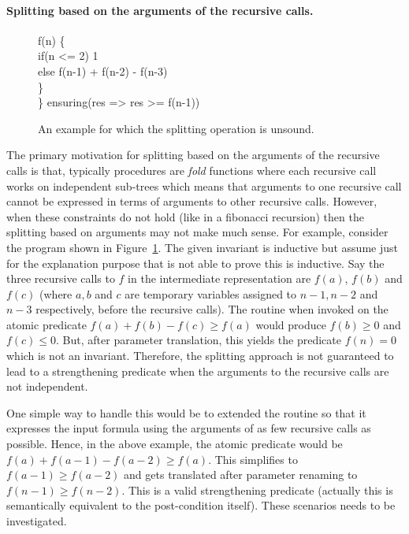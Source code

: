 \paragraph{Splitting based on the arguments of the recursive calls.}

\begin{figure}
\begin{myprogram}
f(n) \{ \\
\pnl \> if(n <= 2) 1 \\
\pnl \> else f(n-1) + f(n-2) - f(n-3) \\
\> \} \\
\} ensuring(res => res >= f(n-1))
\end{myprogram}
\caption{An example for which the splitting operation is unsound.} \label{fig:eg4}
\end{figure}
%
The primary motivation for splitting based on the arguments of the recursive calls
is that, typically procedures are \emph{fold} functions where each recursive call 
works on independent sub-trees which means that arguments to one recursive call
cannot be expressed in terms of  arguments to other recursive calls. 
However, when these constraints do not hold (like in a fibonacci 
recursion) then the splitting based on arguments may not make much sense.
For example, consider the program shown in Figure~\ref{fig:eg4}.
The given invariant is inductive  but  assume just for the explanation purpose that 
\SDecide is not able to prove this is inductive.
Say the three recursive calls to 
$f$ in the intermediate representation are $f(a)$, $f(b)$ and $f(c)$ (where $a,b$ and $c$
are temporary variables assigned to $n-1,n-2$ and $n-3$ respectively, before the
recursive calls). 
The \SG routine when invoked on the atomic predicate $f(a) + f(b) - f(c) \ge f(a)$
would produce $f(b) \ge 0$ and $f(c) \le 0$. But, after parameter translation, this yields 
the predicate $f(n) = 0$ which is not an invariant.
Therefore, the splitting approach is not guaranteed to lead to a strengthening predicate
when the arguments to the recursive calls are not independent.

One simple way to handle this would be to extended the \Eliminate routine so that it
expresses the input formula using the arguments of as few recursive calls as possible.
Hence, in the above example, the atomic predicate would be $f(a) + f(a-1) - f(a-2) \ge f(a)$.
This simplifies to $f(a-1) \ge f(a-2)$ and gets translated after parameter renaming to 
$f(n-1) \ge f(n-2)$. This is a valid strengthening predicate (actually this is semantically
equivalent to the post-condition itself).
These scenarios needs to be investigated.

